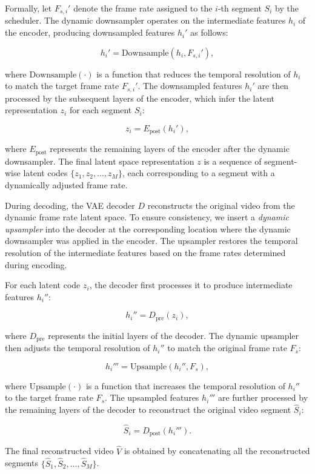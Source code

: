 Formally, let \( F_{s,i}' \) denote the frame rate assigned to the \( i \)-th segment \( S_i \) by the scheduler. The dynamic downsampler operates on the intermediate features \( h_i \) of the encoder, producing downsampled features \( h_i' \) as follows:

\[
h_i' = \text{Downsample}(h_i, F_{s,i}'),
\]

where \( \text{Downsample}(\cdot) \) is a function that reduces the temporal resolution of \( h_i \) to match the target frame rate \( F_{s,i}' \). The downsampled features \( h_i' \) are then processed by the subsequent layers of the encoder, which infer the latent representation \( z_i \) for each segment \( S_i \):

\[
z_i = E_{\text{post}}(h_i'),
\]

where \( E_{\text{post}} \) represents the remaining layers of the encoder after the dynamic downsampler. The final latent space representation \( z \) is a sequence of segment-wise latent codes \( \{z_1, z_2, \dots, z_M\} \), each corresponding to a segment with a dynamically adjusted frame rate.

During decoding, the VAE decoder \( D \) reconstructs the original video from the dynamic frame rate latent space. To ensure consistency, we insert a \textit{dynamic upsampler} into the decoder at the corresponding location where the dynamic downsampler was applied in the encoder. The upsampler restores the temporal resolution of the intermediate features based on the frame rates determined during encoding.

For each latent code \( z_i \), the decoder first processes it to produce intermediate features \( h_i'' \):

\[
h_i'' = D_{\text{pre}}(z_i),
\]

where \( D_{\text{pre}} \) represents the initial layers of the decoder. The dynamic upsampler then adjusts the temporal resolution of \( h_i'' \) to match the original frame rate \( F_s \):

\[
h_i''' = \text{Upsample}(h_i'', F_s),
\]

where \( \text{Upsample}(\cdot) \) is a function that increases the temporal resolution of \( h_i'' \) to the target frame rate \( F_s \). The upsampled features \( h_i''' \) are further processed by the remaining layers of the decoder to reconstruct the original video segment \( \hat{S}_i \):

\[
\hat{S}_i = D_{\text{post}}(h_i''').
\]

The final reconstructed video \( \hat{V} \) is obtained by concatenating all the reconstructed segments \( \{\hat{S}_1, \hat{S}_2, \dots, \hat{S}_M\} \).
